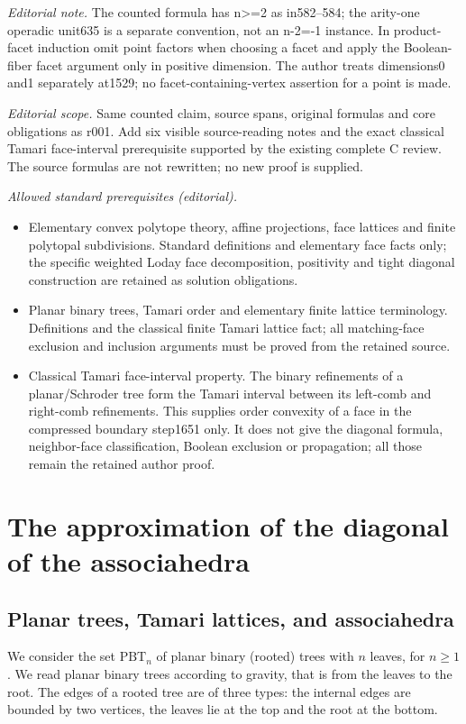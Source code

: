 \documentclass[10pt,a4paper]{amsart}
\numberwithin{equation}{section}\providecommand{\No}{}
\theoremstyle{plain}
\theoremstyle{definition}
\newcommand{\Tam}[1]{\mathrm{PBT}_{#1}}
\begin{document}
\noindent\textit{Editorial note.} The counted formula has n>=2 as in582–584; the arity-one operadic unit635 is a separate convention, not an n-2=-1 instance. In product-facet induction omit point factors when choosing a facet and apply the Boolean-fiber facet argument only in positive dimension. The author treats dimensions0 and1 separately at1529; no facet-containing-vertex assertion for a point is made.\par\medskip
\noindent\textit{Editorial scope.} Same counted claim, source spans, original formulas and core obligations as r001. Add six visible source-reading notes and the exact classical Tamari face-interval prerequisite supported by the existing complete C review. The source formulas are not rewritten; no new proof is supplied.\par\medskip
\noindent\textit{Allowed standard prerequisites (editorial).}\begin{itemize}
\item Elementary convex polytope theory, affine projections, face lattices and finite polytopal subdivisions. Standard definitions and elementary face facts only; the specific weighted Loday face decomposition, positivity and tight diagonal construction are retained as solution obligations.
\item Planar binary trees, Tamari order and elementary finite lattice terminology. Definitions and the classical finite Tamari lattice fact; all matching-face exclusion and inclusion arguments must be proved from the retained source.
\item Classical Tamari face-interval property. The binary refinements of a planar/Schroder tree form the Tamari interval between its left-comb and right-comb refinements. This supplies order convexity of a face in the compressed boundary step1651 only. It does not give the diagonal formula, neighbor-face classification, Boolean exclusion or propagation; all those remain the retained author proof.
\end{itemize}\medskip
\section{The approximation of the diagonal of the associahedra}
\subsection{Planar trees, Tamari lattices, and associahedra}

We consider the set $\Tam{n}$ of planar binary (rooted) trees with $n$ leaves, for $n\geq 1$. We read planar binary trees according to gravity, that is from the leaves to the root. The edges of a rooted tree are of three types: the internal edges are bounded by two vertices, the leaves lie at the top and the root at the bottom.
\end{document}

